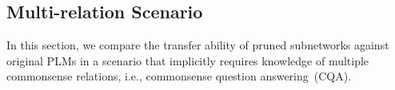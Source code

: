 





%		
%		
%		

\subsection{Multi-relation Scenario}
\label{sec:csr}
In this section, we compare the transfer ability of pruned subnetworks against original PLMs in 
a scenario that implicitly requires knowledge of multiple commonsense relations, 
i.e., commonsense question answering~(CQA).

